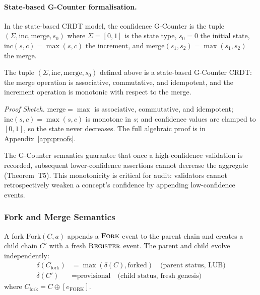 \paragraph{State-based G-Counter formalisation.} In the state-based CRDT model, the confidence G-Counter is the tuple $(\Sigma, \text{inc}, \text{merge}, s_0)$ where $\Sigma = [0,1]$ is the state type, $s_0 = 0$ the initial state, $\text{inc}(s, c) = \max(s, c)$ the increment, and $\text{merge}(s_1, s_2) = \max(s_1, s_2)$ the merge.

\begin{theorem}\label{thm:confidence-gcounter}
The tuple $(\Sigma, \text{inc}, \text{merge}, s_0)$ defined above is a state-based G-Counter CRDT: the merge operation is associative, commutative, and idempotent, and the increment operation is monotonic with respect to the merge.
\end{theorem}
\emph{Proof Sketch.} $\text{merge} = \max$ is associative, commutative, and idempotent; $\text{inc}(s, c) = \max(s, c)$ is monotone in $s$; and confidence values are clamped to $[0,1]$, so the state never decreases. The full algebraic proof is in Appendix~\ref{app:proofs}.

The G-Counter semantics guarantee that once a high-confidence validation is recorded, subsequent lower-confidence assertions cannot decrease the aggregate (Theorem~T5). This monotonicity is critical for audit: validators cannot retrospectively weaken a concept's confidence by appending low-confidence events.

\subsubsection{Fork and Merge Semantics}\label{subsubsec:fork-merge}

A fork $\text{Fork}(C, a)$ appends a $\textsc{Fork}$ event to the parent chain and creates a child chain $C'$ with a fresh $\textsc{Register}$ event. The parent and child evolve independently:
\begin{align}
    \delta(C_{\text{fork}}) &= \max(\delta(C), \text{forked}) \quad \text{(parent status, LUB)} \\
    \delta(C') &= \text{provisional} \quad \text{(child status, fresh genesis)}
\end{align}
where $C_{\text{fork}} = C \oplus [e_{\text{FORK}}]$.

